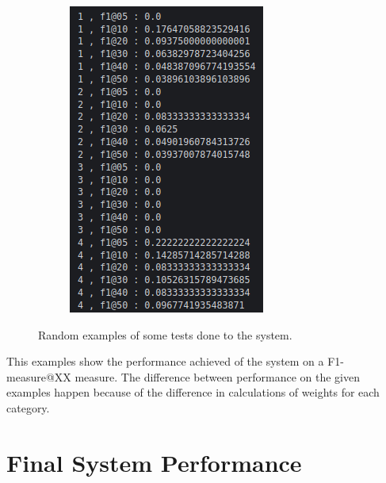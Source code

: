 \begin{figure}[H]
\begin{subfigure}{0.22\textwidth}
  \end{subfigure}
  \begin{subfigure}{0.22\textwidth}
  \includegraphics[width=\textwidth]{Sections/7Results/images/runexample4.png}\hfill
  \end{subfigure}
  \caption{Random examples of some tests done to the system.}
\end{figure}
\newpage

This examples show the performance achieved of the system on a F1-measure@XX measure. The difference between performance on the given examples happen because of the difference in calculations of weights for each category.


\section{Final System Performance}
\label{sec:example}


